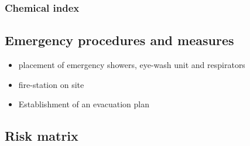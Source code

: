 \subsubsection{Chemical index}

\subsection{Emergency procedures and measures}

\begin{itemize}
    \item placement of emergency showers, eye-wash unit and respirators
    \item fire-station on site 
    \item Establishment of an evacuation plan 
\end{itemize}




\subsection{Risk matrix}

